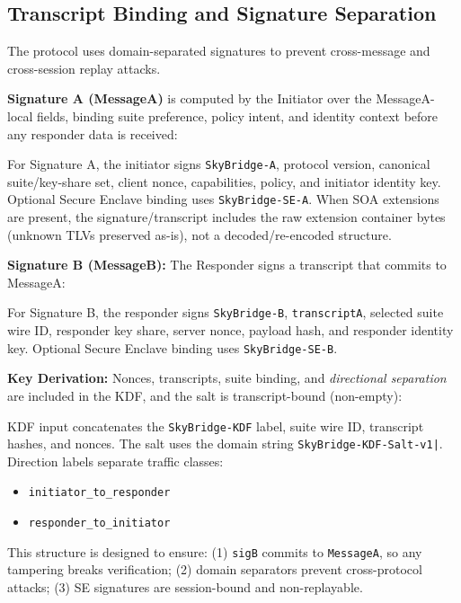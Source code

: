 \documentclass[10pt,journal,compsoc]{IEEEtran}
\begin{document}
\subsection{Transcript Binding and Signature
Separation}\label{f.-transcript-binding-and-signature-separation}

The protocol uses domain-separated signatures to prevent cross-message
and cross-session replay attacks.

\textbf{Signature A (MessageA)} is computed by the Initiator over the
MessageA-local fields, binding suite preference, policy intent, and
identity context before any responder data is received:

For Signature A, the initiator signs \texttt{SkyBridge-A}, protocol
version, canonical suite/key-share set, client nonce, capabilities,
policy, and initiator identity key. Optional Secure Enclave binding
uses \texttt{SkyBridge-SE-A}.
When SOA extensions are present, the signature/transcript includes the
raw extension container bytes (unknown TLVs preserved as-is), not a
decoded/re-encoded structure.

\textbf{Signature B (MessageB):} The Responder signs a transcript that
commits to MessageA:

For Signature B, the responder signs \texttt{SkyBridge-B},
\texttt{transcriptA}, selected suite wire ID, responder key share,
server nonce, payload hash, and responder identity key. Optional Secure
Enclave binding uses \texttt{SkyBridge-SE-B}.

\textbf{Key Derivation:} Nonces, transcripts, suite binding, and
\emph{directional separation} are included in the KDF, and the salt is
transcript-bound (non-empty):

KDF input concatenates the \texttt{SkyBridge-KDF} label, suite wire ID,
transcript hashes, and nonces. The salt uses the domain string
\texttt{SkyBridge-KDF-Salt-v1|}. Direction labels separate traffic
classes:
\begin{itemize}
\item \texttt{initiator\_to\_responder}
\item \texttt{responder\_to\_initiator}
\end{itemize}


This structure is designed to ensure: (1) \texttt{sigB} commits to \texttt{MessageA},
so any tampering breaks verification; (2) domain separators prevent
cross-protocol attacks; (3) SE signatures are session-bound and
non-replayable.
\end{document}
